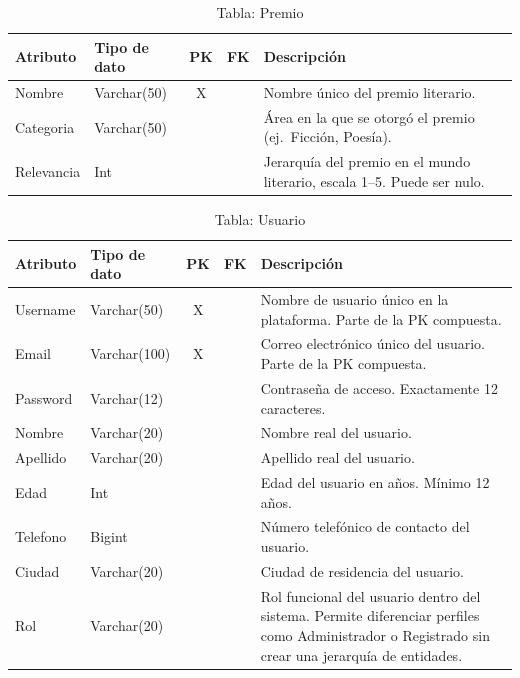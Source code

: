 \documentclass[12pt,a4paper]{article}
\begin{document}
\begin{table}[H]
\centering
\begin{tabularx}{\textwidth}{|l|l|c|c|X|}
\hline
\textbf{Atributo} & \textbf{Tipo de dato} & \textbf{PK} & \textbf{FK} & \textbf{Descripción} \\ \hline
Nombre     & Varchar(50) & X & & Nombre único del premio literario. \\ \hline
Categoria  & Varchar(50) & & & Área en la que se otorgó el premio (ej.\ Ficción, Poesía). \\ \hline
Relevancia & Int         & & & Jerarquía del premio en el mundo literario, escala 1--5. Puede ser nulo. \\ \hline
\end{tabularx}
\caption{Tabla: Premio}
\end{table}

\begin{table}[H]
\centering
\begin{tabularx}{\textwidth}{|l|l|c|c|X|}
\hline
\textbf{Atributo} & \textbf{Tipo de dato} & \textbf{PK} & \textbf{FK} & \textbf{Descripción} \\ \hline
Username & Varchar(50)  & X & & Nombre de usuario único en la plataforma. Parte de la PK compuesta. \\ \hline
Email    & Varchar(100) & X & & Correo electrónico único del usuario. Parte de la PK compuesta. \\ \hline
Password & Varchar(12)  & & & Contraseña de acceso. Exactamente 12 caracteres. \\ \hline
Nombre   & Varchar(20)  & & & Nombre real del usuario. \\ \hline
Apellido & Varchar(20)  & & & Apellido real del usuario. \\ \hline
Edad     & Int          & & & Edad del usuario en años. Mínimo 12 años. \\ \hline
Telefono & Bigint       & & & Número telefónico de contacto del usuario. \\ \hline
Ciudad   & Varchar(20)  & & & Ciudad de residencia del usuario. \\ \hline
Rol      & Varchar(20)  & & & Rol funcional del usuario dentro del sistema. Permite diferenciar perfiles como Administrador o Registrado sin crear una jerarquía de entidades. \\ \hline
\end{tabularx}
\caption{Tabla: Usuario}
\end{table}
\end{document}
